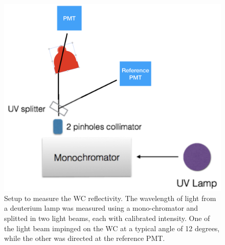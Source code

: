 \begin{figure}
	\centering
	\includegraphics[width=0.95\columnwidth,keepaspectratio]{img/wcSetup.png}
	\caption{Setup to measure the WC reflectivity. The wavelength of light from a deuterium lamp was measured using a mono-chromator and splitted in two
            light beams, each with calibrated intensity. One of the light beam impinged on the WC at a typical angle of 12 degrees, while the other was directed at the reference PMT.
				}
	\label{fig:wcSetup}
\end{figure}


